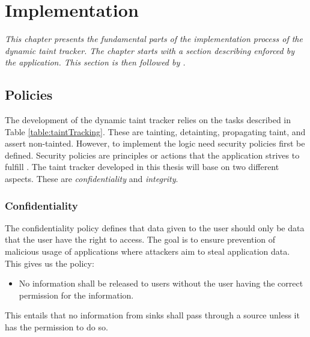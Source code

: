 \chapter{Implementation}
\label{Implementation}

\textit{This chapter presents the fundamental parts of the implementation process of the dynamic taint tracker. The chapter starts with a section describing \textit{} enforced by the application. This section is then followed by \textit{}.}



\section{Policies}
\label{Policies}
The development of the dynamic taint tracker relies on the tasks described in Table \ref{table:taintTracking}. These are tainting, detainting, propagating taint, and assert non-tainted. However, to implement the logic need security policies first be defined. Security policies are principles or actions that the application strives to fulfill \parencite{BayukJenniferL2012Cspg}. The taint tracker developed in this thesis will base on two different aspects. These are \textit{confidentiality} and \textit{integrity}.



\subsection{Confidentiality}
The confidentiality policy defines that data given to the user should only be data that the user have the right to access. The goal is to ensure prevention of malicious usage of applications where attackers aim to steal application data. This gives us the policy:

\hfill
\begin{itemize}
    \item No information shall be released to users without the user having the correct permission for the information.
\end{itemize}
\hfill

This entails that no information from sinks shall pass through a source unless it has the permission to do so.



